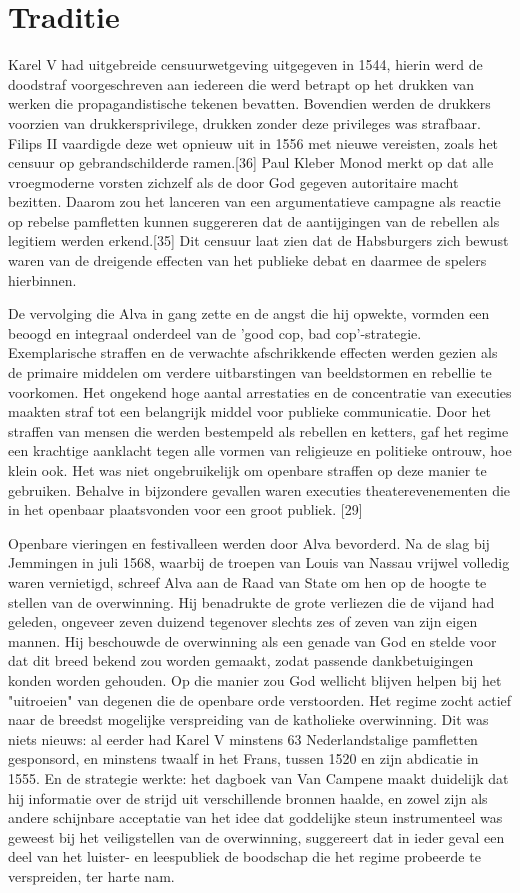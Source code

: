 \documentclass[11pt]{amsart}
\begin{document}
\section*{Traditie}
\noindent Karel V had uitgebreide censuurwetgeving uitgegeven in 1544, hierin werd de doodstraf voorgeschreven aan iedereen die werd betrapt op het drukken van werken die propagandistische tekenen bevatten. Bovendien werden de drukkers voorzien van drukkersprivilege, drukken zonder deze privileges was strafbaar. Filips II vaardigde deze wet opnieuw uit in 1556 met nieuwe vereisten, zoals het censuur op gebrandschilderde ramen.[36] Paul Kleber Monod merkt op dat alle vroegmoderne vorsten zichzelf als de door God gegeven autoritaire macht bezitten. Daarom zou het lanceren van een argumentatieve campagne als reactie op rebelse pamfletten kunnen suggereren dat de aantijgingen van de rebellen als legitiem werden erkend.[35] Dit censuur laat zien dat de Habsburgers zich bewust waren van de dreigende effecten van het publieke debat en daarmee de spelers hierbinnen.

De vervolging die Alva in gang zette en de angst die hij opwekte, vormden een beoogd en integraal onderdeel van de
'good cop, bad cop'-strategie. Exemplarische straffen en de verwachte afschrikkende effecten werden gezien als de
primaire middelen om verdere uitbarstingen van beeldstormen en rebellie te voorkomen. Het ongekend hoge aantal
arrestaties en de concentratie van executies maakten straf tot een belangrijk middel voor publieke communicatie. Door
het straffen van mensen die werden bestempeld als rebellen en ketters, gaf het regime een krachtige aanklacht tegen
alle vormen van religieuze en politieke ontrouw, hoe klein ook. Het was niet ongebruikelijk om openbare straffen op
deze manier te gebruiken. Behalve in bijzondere gevallen waren executies theaterevenementen die in het openbaar
plaatsvonden voor een groot publiek. [29]

Openbare vieringen en festivalleen werden door Alva bevorderd. Na de slag bij Jemmingen in juli 1568, waarbij de
troepen van Louis van Nassau vrijwel volledig waren vernietigd, schreef Alva aan de Raad van State om hen op de hoogte
te stellen van de overwinning. Hij benadrukte de grote verliezen die de vijand had geleden, ongeveer zeven duizend
tegenover slechts zes of zeven van zijn eigen mannen. Hij beschouwde de overwinning als een genade van God en stelde
voor dat dit breed bekend zou worden gemaakt, zodat passende dankbetuigingen konden worden gehouden. Op die manier zou
God wellicht blijven helpen bij het "uitroeien" van degenen die de openbare orde verstoorden. Het regime zocht actief
naar de breedst mogelijke verspreiding van de katholieke overwinning. Dit was niets nieuws: al eerder had Karel V
minstens 63 Nederlandstalige pamfletten gesponsord, en minstens twaalf in het Frans, tussen 1520 en zijn abdicatie in
1555. En de strategie werkte: het dagboek van Van Campene maakt duidelijk dat hij informatie over de strijd uit
verschillende bronnen haalde, en zowel zijn als andere schijnbare acceptatie van het idee dat goddelijke steun
instrumenteel was geweest bij het veiligstellen van de overwinning, suggereert dat in ieder geval een deel van het
luister- en leespubliek de boodschap die het regime probeerde te verspreiden, ter harte nam.
\end{document}

